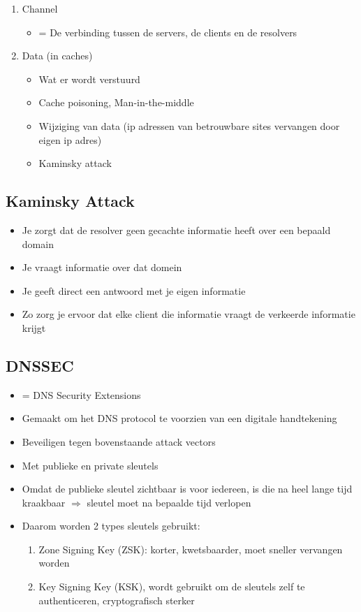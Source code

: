 \documentclass{article}
\begin{document}
\begin{enumerate}
    \item Channel
    \begin{itemize}
        \item = De verbinding tussen de servers, de clients en de resolvers
    \end{itemize}
    \item Data (in caches)
    \begin{itemize}
        \item Wat er wordt verstuurd
        \item Cache poisoning, Man-in-the-middle
        \item Wijziging van data (ip adressen van betrouwbare sites vervangen door eigen ip adres)
        \item Kaminsky attack
    \end{itemize}
\end{enumerate}

\subsection{Kaminsky Attack}

\begin{itemize}
    \item Je zorgt dat de resolver geen gecachte informatie heeft over een bepaald domain
    \item Je vraagt informatie over dat domein
    \item Je geeft direct een antwoord met je eigen informatie
    \item Zo zorg je ervoor dat elke client die informatie vraagt de verkeerde informatie krijgt
\end{itemize}

\subsection{DNSSEC}

\begin{itemize}
    \item = DNS Security Extensions
    \item Gemaakt om het DNS protocol te voorzien van een digitale handtekening
    \item Beveiligen tegen bovenstaande attack vectors
    \item Met publieke en private sleutels
    \item Omdat de publieke sleutel zichtbaar is voor iedereen, is die na heel lange tijd kraakbaar $\Rightarrow$ sleutel moet na bepaalde tijd verlopen
    \item Daarom worden 2 types sleutels gebruikt:
    \begin{enumerate}
        \item Zone Signing Key (ZSK): korter, kwetsbaarder, moet sneller vervangen worden
        \item Key Signing Key (KSK), wordt gebruikt om de sleutels zelf te authenticeren, cryptografisch sterker
    \end{enumerate}
\end{itemize}
\end{document}
